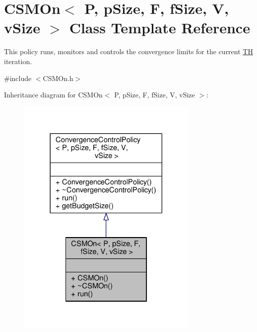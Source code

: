 \hypertarget{classCSMOn}{}\section{C\+S\+M\+On$<$ P, p\+Size, F, f\+Size, V, v\+Size $>$ Class Template Reference}
\label{classCSMOn}


This policy runs, monitors and controls the convergence limits for the current \hyperlink{classTH}{TH} iteration.  




{\ttfamily \#include $<$C\+S\+M\+On.\+h$>$}



Inheritance diagram for C\+S\+M\+On$<$ P, p\+Size, F, f\+Size, V, v\+Size $>$\+:
\nopagebreak
\begin{figure}[H]
\begin{center}
\leavevmode
\includegraphics[width=249pt]{classCSMOn__inherit__graph}
\end{center}
\end{figure}


